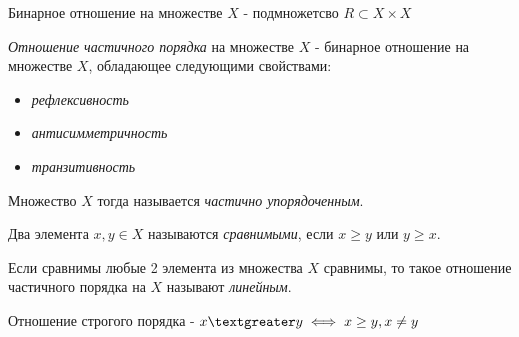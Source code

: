

\begin{definition} \thmslashn

	Бинарное отношение на множестве $X$ - подмножетсво $R \subset X \times X$
\end{definition}

\begin{definition} \thmslashn

	\textit{Отношение частичного порядка} на множестве $X$ - бинарное отношение на множестве $X$, обладающее следующими свойствами:
	\begin{itemize}
		\item
			\textit{рефлексивность}
		\item
			\textit{антисимметричность}
		\item
			\textit{транзитивность}
	\end{itemize}
	
	Множество $X$ тогда называется \textit{частично упорядоченным}.
	
\end{definition}

\begin{definition} \thmslashn

	Два элемента $x, y \in X$ называются \textit{сравнимыми}, если $x \geq y$ или $y \geq x$.
\end{definition}

\begin{definition} \thmslashn

	Если сравнимы любые 2 элемента из множества $X$ сравнимы, то такое отношение частичного порядка на $X$ называют \textit{линейным}.
\end{definition}

\begin{definition} \thmslashn

	Отношение строгого порядка - $x \textgreater y \iff x \geq y, x \neq y$
\end{definition}


